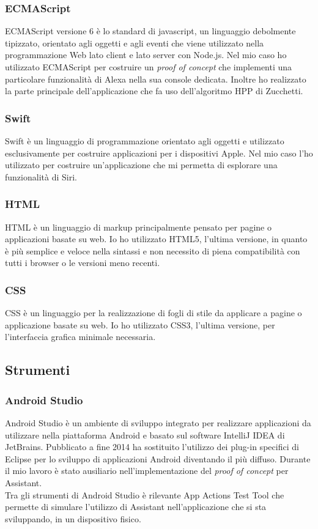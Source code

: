 		\subsubsection{ECMAScript}
		ECMAScript versione 6 è lo standard di javascript, un linguaggio debolmente tipizzato, orientato agli oggetti e agli eventi che viene utilizzato nella programmazione Web lato client e lato server con Node.js. Nel mio caso ho utilizzato ECMAScript per costruire un \textit{proof of concept} che implementi una particolare funzionalità di Alexa nella sua console dedicata. Inoltre ho realizzato la parte principale dell'applicazione che fa uso dell'algoritmo HPP di Zucchetti.
		\subsubsection{Swift}
		Swift è un linguaggio di programmazione orientato agli oggetti e utilizzato esclusivamente per costruire applicazioni per i dispositivi Apple. Nel mio caso l'ho utilizzato per costruire un'applicazione che mi permetta di esplorare una funzionalità di Siri.
		\subsubsection{HTML}
		HTML è un linguaggio di markup principalmente pensato per pagine o applicazioni basate su web. Io ho utilizzato HTML5, l'ultima versione, in quanto è più semplice e veloce nella sintassi e non necessito di piena compatibilità con tutti i browser o le versioni meno recenti.
		\subsubsection{CSS}
		CSS è un linguaggio per la realizzazione di fogli di stile da applicare a pagine o applicazione basate su web. Io ho utilizzato CSS3, l'ultima versione, per l'interfaccia grafica minimale necessaria.
	\subsection{Strumenti}
		\subsubsection{Android Studio}
		Android Studio è un ambiente di sviluppo integrato per realizzare applicazioni da utilizzare nella piattaforma Android e basato sul software IntelliJ IDEA di JetBrains. Pubblicato a fine 2014 ha sostituito l'utilizzo dei plug-in specifici di Eclipse per lo sviluppo di applicazioni Android diventando il più diffuso. Durante il mio lavoro è stato ausiliario nell'implementazione del \textit{proof of concept} per Assistant. \\
		Tra gli strumenti di Android Studio è rilevante App Actions Test Tool che permette di simulare l'utilizzo di Assistant nell'applicazione che si sta sviluppando, in un dispositivo fisico.
